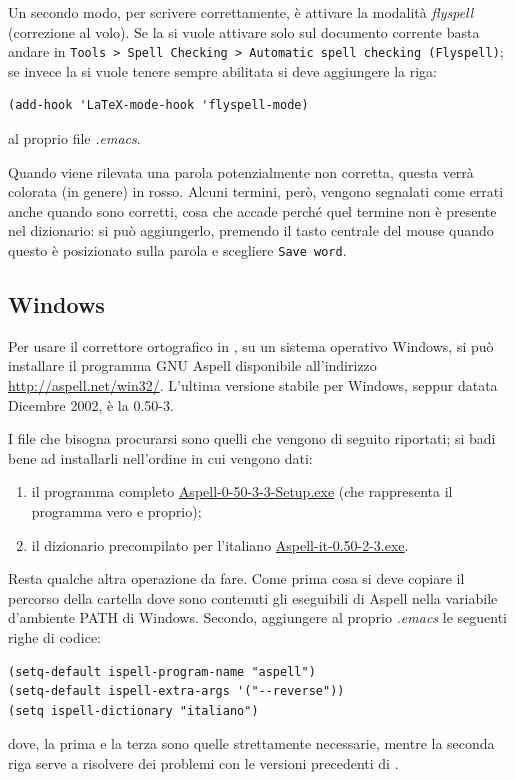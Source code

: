 \documentclass[11pt,a4paper]{article}
\begin{document}
Un secondo modo, per scrivere correttamente, è attivare la modalità
\emph{flyspell} (correzione al volo). Se la si vuole attivare solo sul documento
corrente basta andare in \texttt{Tools > Spell Checking > Automatic spell
  checking (Flyspell)}; se invece la si vuole tenere sempre abilitata si deve
aggiungere la riga:
\begin{Verbatim}
(add-hook 'LaTeX-mode-hook 'flyspell-mode)
\end{Verbatim}
al proprio file \emph{.emacs}.

Quando viene rilevata una parola potenzialmente non corretta, questa verrà
colorata (in genere) in rosso. Alcuni termini, però, vengono segnalati come
errati anche quando sono corretti, cosa che accade perché quel termine non è
presente nel dizionario: si può aggiungerlo, premendo il tasto centrale del
mouse quando questo è posizionato sulla parola e scegliere \texttt{Save word}.

\subsection{Windows}
\label{sec:aspellwin}

Per usare il correttore ortografico in \emacs, su un sistema operativo Windows,
si può installare il programma GNU Aspell disponibile all'indirizzo
\url{http://aspell.net/win32/}. L'ultima versione stabile per Windows, seppur
datata Dicembre 2002, è la 0.50-3.

I file che bisogna procurarsi sono quelli che vengono di seguito
riportati; si badi bene ad installarli nell'ordine in cui vengono
dati:

\begin{enumerate}
\item il programma completo
      \href{http://ftp.gnu.org/gnu/aspell/w32/Aspell-0-50-3-3-Setup.exe}%
      {Aspell-0-50-3-3-Setup.exe} (che rappresenta il programma vero e proprio);
\item il dizionario precompilato per l'italiano
      \href{http://ftp.gnu.org/gnu/aspell/w32/Aspell-it-0.50-2-3.exe}%
      {Aspell-it-0.50-2-3.exe}.
\end{enumerate}

Resta qualche altra operazione da fare. Come prima cosa si deve copiare il
percorso della cartella dove sono contenuti gli eseguibili di Aspell nella
variabile d'ambiente \textsf{PATH} di Windows. Secondo, aggiungere al proprio
\emph{.emacs} le seguenti righe di codice:
\begin{Verbatim}
(setq-default ispell-program-name "aspell")
(setq-default ispell-extra-args '("--reverse"))
(setq ispell-dictionary "italiano")
\end{Verbatim}
dove, la prima e la terza sono quelle strettamente necessarie, mentre la seconda
riga serve a risolvere dei problemi con le versioni precedenti di
\emacs.
\end{document}
